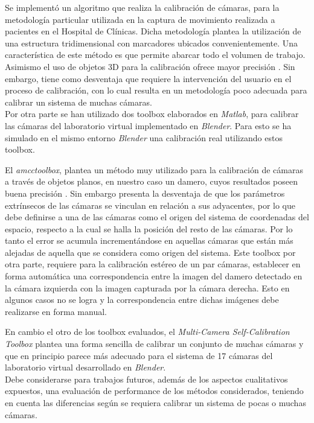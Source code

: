 Se implementó un algoritmo que realiza la calibración de cámaras, para la metodología particular utilizada en la captura de movimiento realizada a pacientes en el Hospital de Clínicas. Dicha metodología plantea la utilización de una estructura tridimensional con marcadores ubicados convenientemente. Una característica de este método es que permite abarcar todo el volumen de trabajo. Asimismo el uso de objetos 3D para la calibración ofrece mayor precisión \cite{zhang_libro}. Sin embargo, tiene como desventaja que requiere la intervención del usuario en el proceso de calibración, con lo cual resulta en un metodología poco adecuada para calibrar un sistema de muchas cámaras.\\


Por otra parte se han utilizado dos toolbox elaborados en \emph{Matlab}, para calibrar las cámaras del laboratorio virtual implementado en \emph{Blender}. Para esto se ha simulado en el mismo entorno \emph{Blender} una calibración real utilizando estos toolbox. 


El \textit{amcctoolbox}, plantea un método muy utilizado para la calibración de cámaras a través de objetos planos, en nuestro caso un damero, cuyos resultados poseen buena precisión \cite{zhang_libro}. Sin embargo presenta la desventaja de que los parámetros extrínsecos de las cámaras se vinculan en relación a sus adyacentes, por lo que debe definirse a una de las cámaras como el origen del sistema de coordenadas del espacio, respecto a la cual se halla la posición del resto de las cámaras. Por lo tanto el error se acumula incrementándose en aquellas cámaras que están más alejadas de aquella que se considera como origen del sistema. Este toolbox por otra parte, requiere para la calibración estéreo de un par cámaras, establecer en forma automática una correspondencia entre la imagen del damero detectado en la cámara izquierda con la imagen capturada por la cámara derecha. Esto en algunos casos no se logra y la correspondencia entre dichas imágenes debe realizarse en forma manual. 


En cambio el otro de los toolbox evaluados, el \textit{Multi-Camera Self-Calibration Toolbox} plantea una forma sencilla de calibrar un conjunto de muchas cámaras y que en principio parece más adecuado para el sistema de 17 cámaras del laboratorio virtual desarrollado en \emph{Blender}.\\

Debe considerarse para trabajos futuros, además de los aspectos cualitativos expuestos,  una evaluación de performance de los métodos considerados, teniendo en cuenta las diferencias según se requiera calibrar un sistema de pocas o muchas cámaras.
